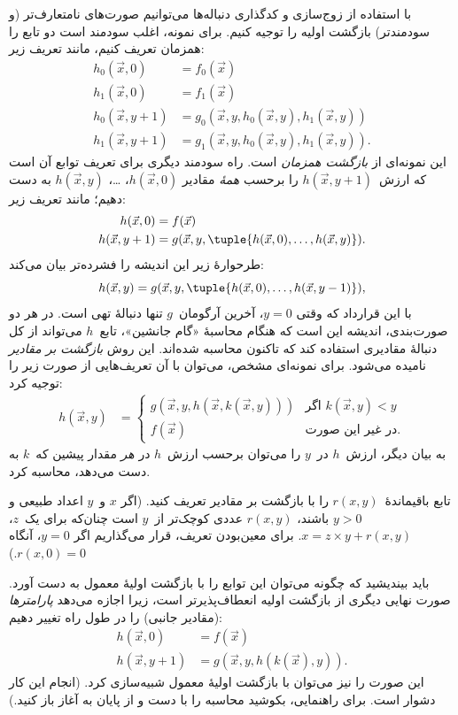 \documentclass[../../../include/open-logic-section]{subfiles}
\begin{document}

با استفاده از زوج‌سازی و کدگذاری دنباله‌ها می‌توانیم صورت‌های
نامتعارف‌تر (و سودمندتر) بازگشت اولیه را توجیه کنیم. برای نمونه، اغلب
سودمند است دو تابع را همزمان تعریف کنیم، مانند تعریف زیر:
\begin{align*}
h_0(\vec x, 0) & = f_0(\vec x) \\
h_1(\vec x, 0) & = f_1(\vec x) \\
h_0(\vec x, y+1) & = g_0(\vec x, y, h_0(\vec x, y), h_1(\vec x, y)) \\
h_1(\vec x, y+1) & = g_1(\vec x, y, h_0(\vec x, y), h_1(\vec x, y)).
\end{align*}
این نمونه‌ای از 
\emph{بازگشت همزمان} است. راه سودمند دیگری برای تعریف توابع آن است که
ارزش~$h(\vec x,y+1)$ را برحسب 
\emph{همهٔ} مقادیر $h(\vec x,0)$، \dots، $h(\vec x,y)$ به دست دهیم؛
مانند تعریف زیر:
\begin{align*}
h(\vec x, 0) & = f(\vec x) \\
h(\vec x, y+1) & = g(\vec x, y, \tuple{h(\vec x, 0), \dots, h(\vec x, y)}).
\end{align*}
طرحوارهٔ زیر این اندیشه را فشرده‌تر بیان می‌کند:
\[
h(\vec x, y) = g(\vec x, y, \tuple{h(\vec x, 0), \dots, h(\vec x, y-1)}),
\]
با این قرارداد که وقتی $y=0$، آخرین آرگومان~$g$ تنها دنبالهٔ تهی
است. در هر دو صورت‌بندی، اندیشه این است که هنگام محاسبهٔ «گام جانشین»،
تابع~$h$ می‌تواند از کل دنبالهٔ مقادیری استفاده کند که تاکنون محاسبه
شده‌اند. این روش 
\emph{بازگشت بر مقادیر} نامیده می‌شود. برای نمونه‌ای مشخص، می‌توان با
آن تعریف‌هایی از صورت زیر را توجیه کرد:
\begin{align*}
h(\vec x, y) & = \begin{cases}
  g(\vec x, y, h(\vec x, k(\vec x, y))) & \text{اگر $k(\vec x, y) < y$} \\
  f(\vec x) & \text{در غیر این صورت}.
\end{cases}
\end{align*}
به بیان دیگر، ارزش~$h$ در~$y$ را می‌توان برحسب ارزش~$h$ در
\emph{هر} مقدار پیشین که~$k$ به دست می‌دهد، محاسبه کرد.


\begin{prob}
  تابع باقیماندهٔ~$r(x,y)$ را با بازگشت بر مقادیر تعریف کنید. (اگر
  $x$ و~$y$ اعداد طبیعی و $y>0$ باشند، $r(x,y)$ عددی کوچک‌تر از~$y$
  است چنان‌که برای یک~$z$،
  $x=z\times y+r(x,y)$. برای معین‌بودن تعریف، قرار می‌گذاریم اگر
  $y=0$، آنگاه $r(x,0)=0$.)
\end{prob}

باید بیندیشید که چگونه می‌توان این توابع را با بازگشت اولیهٔ معمول به
دست آورد. صورت نهایی دیگری از بازگشت اولیه انعطاف‌پذیرتر است، زیرا
اجازه می‌دهد 
\emph{پارامترها} (مقادیر جانبی) را در طول راه تغییر دهیم:
\begin{align*}
h(\vec x, 0) & = f(\vec x) \\
h(\vec x, y+1) & = g(\vec x, y, h(k(\vec x), y)).
\end{align*}
این صورت را نیز می‌توان با بازگشت اولیهٔ معمول شبیه‌سازی کرد. (انجام
این کار دشوار است. برای راهنمایی، بکوشید محاسبه را با دست و از پایان
به آغاز باز کنید.)
\end{document}
